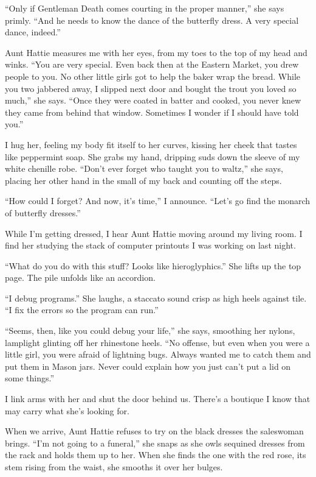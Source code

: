 \documentclass[
]{article}
\begin{document}
``Only if Gentleman Death comes courting in the proper manner,'' she
says primly. ``And he needs to know the dance of the butterfly dress. A
very special dance, indeed.''

Aunt Hattie measures me with her eyes, from my toes to the top of my
head and winks. ``You are very special. Even back then at the Eastern
Market, you drew people to you. No other little girls got to help the
baker wrap the bread. While you two jabbered away, I slipped next door
and bought the trout you loved so much,'' she says. ``Once they were
coated in batter and cooked, you never knew they came from behind that
window. Sometimes I wonder if I should have told you.''

I hug her, feeling my body fit itself to her curves, kissing her cheek
that tastes like peppermint soap. She grabs my hand, dripping suds down
the sleeve of my white chenille robe. ``Don't ever forget who taught you
to waltz,'' she says, placing her other hand in the small of my back and
counting off the steps.

``How could I forget? And now, it's time,'' I announce. ``Let's go find
the monarch of butterfly dresses.''

While I'm getting dressed, I hear Aunt Hattie moving around my living
room. I find her study­ing the stack of computer printouts I was working
on last night.

``What do you do with this stuff? Looks like hieroglyphics.'' She lifts
up the top page. The pile unfolds like an accordion.

``I debug programs.'' She laughs, a staccato sound crisp as high heels
against tile. ``I fix the errors so the program can run.''

``Seems, then, like you could debug your life,'' she says, smoothing her
nylons, lamplight glinting off her rhinestone heels. ``No offense, but
even when you were a little girl, you were afraid of lightning bugs.
Always wanted me to catch them and put them in Mason jars. Never could
explain how you just can't put a lid on some things.''

I link arms with her and shut the door behind us. There's a boutique I
know that may carry what she's looking for.

When we arrive, Aunt Hattie refuses to try on the black dresses the
saleswoman brings. ``I'm not going to a funeral,'' she snaps as she owls
sequined dresses from the rack and holds them up to her. When she finds
the one with the red rose, its stem rising from the waist, she smooths
it over her bulges.
\end{document}
